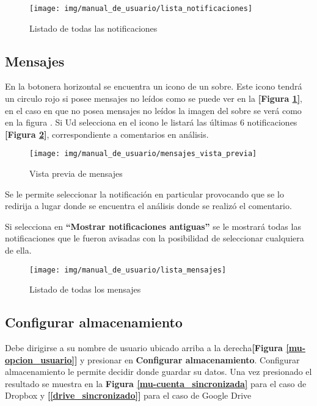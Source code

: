 \begin{figure}
	\centering
	\texttt{[image: img/manual\_de\_usuario/lista\_notificaciones]}
	\caption{Listado de todas las notificaciones}
	\label{mu-lista_notificaciones}
\end{figure}



\subsection{Mensajes}
En la botonera horizontal se encuentra un icono de un sobre. Este icono tendrá un circulo rojo si posee mensajes no leídos  como se puede ver en la \textbf{[Figura \ref{mu-lista_notificaciones}]}, en el caso en que no posea mensajes no leídos la imagen del sobre se verá como en la figura . Si Ud selecciona en el icono le listará las últimas 6 notificaciones \textbf{[Figura \ref{mu-mensajes_vista_previa}]}, correspondiente a  comentarios en análisis. 
\begin{figure}
	\centering
	\texttt{[image: img/manual\_de\_usuario/mensajes\_vista\_previa]}
	\caption{Vista previa de mensajes}
	\label{mu-mensajes_vista_previa}
\end{figure}
Se le permite seleccionar la notificación en particular provocando que se lo redirija a lugar donde se encuentra el análisis donde se realizó el comentario.

Si selecciona en \textbf{``Mostrar notificaciones antiguas''} se le mostrará todas las notificaciones que le fueron avisadas con la posibilidad de seleccionar cualquiera de ella.

\begin{figure}
	\centering
	\texttt{[image: img/manual\_de\_usuario/lista\_mensajes]}
	\caption{Listado de todas los mensajes}
	\label{mu-lista_mensajes}
\end{figure}




\subsection{Configurar almacenamiento}
Debe dirigirse a su nombre de usuario ubicado arriba a la derecha\textbf{[Figura \ref{mu-opcion_usuario}]} y presionar en \textbf{Configurar almacenamiento}. Configurar almacenamiento le permite decidir donde guardar su datos. Una vez presionado el resultado se muestra en la \textbf{Figura \ref{mu-cuenta_sincronizada}} para el caso de Dropbox y \textbf{[\ref{drive_sincronizado}]} para el caso de Google Drive


